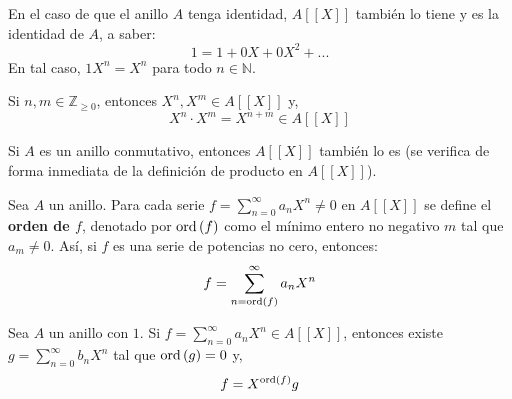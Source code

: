 \documentclass[12pt]{report}
\theoremstyle{largebreak}
\newcommand{\ord}[1]{\ensuremath{\textup{ord}\left(#1\right)}}
\begin{document}
    \begin{obs}
        En el caso de que el anillo $A$ tenga identidad, $A[[X]]$ también lo tiene y es la identidad de $A$, a saber:
        \begin{equation*}
            1=1+0X+0X^2+...
        \end{equation*}
        En tal caso, $1X^n=X^n$ para todo $n\in\mathbb{N}$.
    \end{obs}

    \begin{obs}
        Si $n,m\in\mathbb{Z}_{\geq0}$, entonces $X^n,X^m\in A[[X]]$ y,
        \begin{equation*}
            X^n\cdot X^m=X^{ n+m}\in A[[X]]
        \end{equation*}
    \end{obs}

    \begin{obs}
        Si $A$ es un anillo conmutativo, entonces $A[[X]]$ también lo es (se verifica de forma inmediata de la definición de producto en $A[[X]]$).
    \end{obs}

    \begin{mydef}
        Sea $A$ un anillo. Para cada serie $f=\sum_{ n=0}^\infty a_nX^n\neq0$ en $A[[X]]$ se define el \textbf{orden de $f$}, denotado por $\ord{f}$ como el mínimo entero no negativo $m$ tal que $a_{m}\neq0$. Así, si $f$ es una serie de potencias no cero, entonces:
        \begin{equation*}
            f=\sum_{ n=\ord{f}}^\infty a_nX^n
        \end{equation*}
    \end{mydef}

    \begin{excer}
        Sea $A$ un anillo con $1$. Si $f=\sum_{ n=0}^\infty a_nX^n\in A[[X]]$, entonces existe $g=\sum_{ n=0}^\infty b_nX^n$ tal que $\ord{g}=0$ y,
        \begin{equation*}
            f=X^{\ord{f}}g
        \end{equation*}
    \end{excer}
\end{document}
